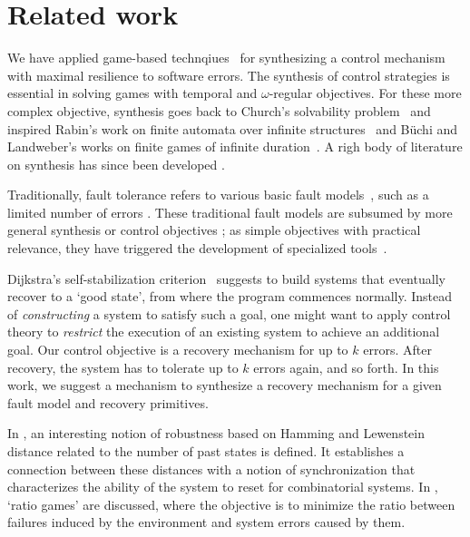 \documentclass[times,10pt,twocolumn]{article}
\begin{document}
\section{Related work\label{sec.relwork}}

We have applied game-based technqiues~\cite{Church63,PR89a,Rabin69} \label{reply1.related.work.1st.para} 
for synthesizing a control mechanism with maximal resilience to software errors.  
The synthesis of control strategies is essential in solving games with temporal and $\omega$-regular objectives.  
For these more complex objective, synthesis goes back to Church's solvability problem~\cite{Church63} and 
inspired Rabin's work on finite automata over infinite 
structures~\cite{Rabin69} and 
B\"uchi and Landweber's works on finite games 
of infinite duration~\cite{Buchi62,BL69}. 
A righ body of literature on synthesis
has since been developed \cite{AAE04,EKA08,GR09,KV00,PR89b,Rushby92,SF06}.

Traditionally, fault tolerance refers to various basic fault models~\cite{AAE04}, 
such as a limited number of errors \cite{JRT04}.
These traditional fault models are subsumed 
by more general synthesis or control objectives 
\cite{AMP95,AAE04,Thomas94};\label{reply2.RW} 
as simple objectives with practical relevance, 
they have triggered the development of specialized tools~\cite{EKA08,GR09}.

Dijkstra's self-stabilization criterion~\cite{AG93,Dijkstra86} suggests to build systems that eventually recover
to a `good state', from where the program commences normally.
Instead of {\em constructing} a system to satisfy such a goal, one
might want to apply control theory to {\em restrict} the execution of
an existing system to achieve an additional goal.
Our control objective is a recovery mechanism for up to $k$ errors.
After recovery, the system has to tolerate up to $k$ errors again, and so forth.
In this work, 
we suggest a mechanism to synthesize a recovery mechanism for a given fault model and recovery primitives.


In \cite{DHLN10}, an interesting notion of robustness based on Hamming 
and Lewenstein distance related to the number of past states is defined. 
It establishes a connection between these distances with a notion of 
synchronization that characterizes the ability of the system to reset for 
combinatorial systems.
In \cite{BGHJ09}, `ratio games' are discussed, where the objective is 
to minimize the ratio between failures induced by the environment and system errors caused by them.
\end{document}
